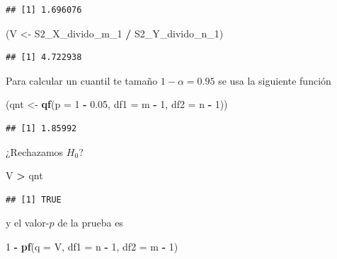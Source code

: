 \documentclass[
  12pt,
]{book}
\newenvironment{Shaded}{\begin{snugshade}}{\end{snugshade}}
\newcommand{\DataTypeTok}[1]{\textcolor[rgb]{0.13,0.29,0.53}{#1}}
\newcommand{\DecValTok}[1]{\textcolor[rgb]{0.00,0.00,0.81}{#1}}
\newcommand{\FloatTok}[1]{\textcolor[rgb]{0.00,0.00,0.81}{#1}}
\newcommand{\KeywordTok}[1]{\textcolor[rgb]{0.13,0.29,0.53}{\textbf{#1}}}
\newcommand{\NormalTok}[1]{#1}
\newcommand{\OperatorTok}[1]{\textcolor[rgb]{0.81,0.36,0.00}{\textbf{#1}}}
\newcommand{\StringTok}[1]{\textcolor[rgb]{0.31,0.60,0.02}{#1}}
\begin{document}
\begin{verbatim}
## [1] 1.696076
\end{verbatim}

\begin{Shaded}
\begin{Highlighting}[]
\NormalTok{(V \textless{}{-}}\StringTok{ }\NormalTok{S2\_X\_divido\_m\_}\DecValTok{1} \OperatorTok{/}\StringTok{ }\NormalTok{S2\_Y\_divido\_n\_}\DecValTok{1}\NormalTok{)}
\end{Highlighting}
\end{Shaded}

\begin{verbatim}
## [1] 4.722938
\end{verbatim}

Para calcular un cuantil te tamaño \(1-\alpha = 0.95\) se usa la siguiente función

\begin{Shaded}
\begin{Highlighting}[]
\NormalTok{(qnt \textless{}{-}}\StringTok{ }\KeywordTok{qf}\NormalTok{(}\DataTypeTok{p =} \DecValTok{1} \OperatorTok{{-}}\StringTok{ }\FloatTok{0.05}\NormalTok{, }\DataTypeTok{df1 =}\NormalTok{ m }\OperatorTok{{-}}\StringTok{ }\DecValTok{1}\NormalTok{, }\DataTypeTok{df2 =}\NormalTok{ n }\OperatorTok{{-}}\StringTok{ }\DecValTok{1}\NormalTok{))}
\end{Highlighting}
\end{Shaded}

\begin{verbatim}
## [1] 1.85992
\end{verbatim}

¿Rechazamos \(H_0\)?

\begin{Shaded}
\begin{Highlighting}[]
\NormalTok{V }\OperatorTok{\textgreater{}}\StringTok{ }\NormalTok{qnt}
\end{Highlighting}
\end{Shaded}

\begin{verbatim}
## [1] TRUE
\end{verbatim}

y el valor-\(p\) de la prueba es

\begin{Shaded}
\begin{Highlighting}[]
\DecValTok{1} \OperatorTok{{-}}\StringTok{ }\KeywordTok{pf}\NormalTok{(}\DataTypeTok{q =}\NormalTok{ V, }\DataTypeTok{df1 =}\NormalTok{ n }\OperatorTok{{-}}\StringTok{ }\DecValTok{1}\NormalTok{, }\DataTypeTok{df2 =}\NormalTok{ m }\OperatorTok{{-}}\StringTok{ }\DecValTok{1}\NormalTok{)}
\end{Highlighting}
\end{Shaded}
\end{document}
